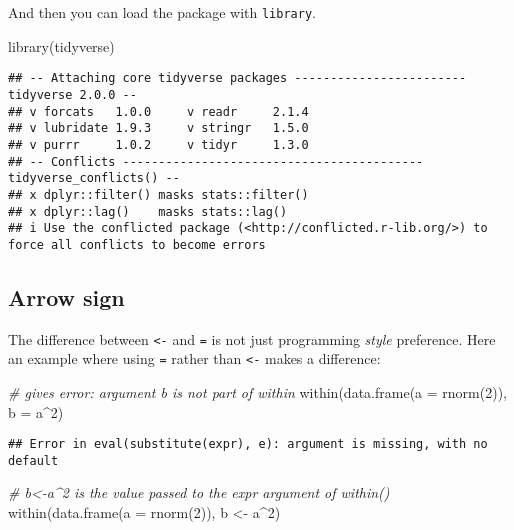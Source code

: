 \documentclass[
  oneside]{book}
\newenvironment{Shaded}{\begin{snugshade}}{\end{snugshade}}
\newcommand{\AttributeTok}[1]{\textcolor[rgb]{0.77,0.63,0.00}{#1}}
\newcommand{\CommentTok}[1]{\textcolor[rgb]{0.56,0.35,0.01}{\textit{#1}}}
\newcommand{\DecValTok}[1]{\textcolor[rgb]{0.00,0.00,0.81}{#1}}
\newcommand{\FunctionTok}[1]{\textcolor[rgb]{0.00,0.00,0.00}{#1}}
\newcommand{\NormalTok}[1]{#1}
\newcommand{\OtherTok}[1]{\textcolor[rgb]{0.56,0.35,0.01}{#1}}
\newcommand{\SpecialCharTok}[1]{\textcolor[rgb]{0.00,0.00,0.00}{#1}}
\begin{document}
And then you can load the package with \texttt{library}.

\begin{Shaded}
\begin{Highlighting}[]
\FunctionTok{library}\NormalTok{(tidyverse)}
\end{Highlighting}
\end{Shaded}

\begin{verbatim}
## -- Attaching core tidyverse packages ------------------------ tidyverse 2.0.0 --
## v forcats   1.0.0     v readr     2.1.4
## v lubridate 1.9.3     v stringr   1.5.0
## v purrr     1.0.2     v tidyr     1.3.0
## -- Conflicts ------------------------------------------ tidyverse_conflicts() --
## x dplyr::filter() masks stats::filter()
## x dplyr::lag()    masks stats::lag()
## i Use the conflicted package (<http://conflicted.r-lib.org/>) to force all conflicts to become errors
\end{verbatim}

\hypertarget{arrow-sign}{%
\subsection{Arrow sign}\label{arrow-sign}}

The difference between \texttt{\textless{}-} and \texttt{=} is not just programming \emph{style} preference.
Here an example where using \texttt{=} rather than \texttt{\textless{}-} makes a difference:

\begin{Shaded}
\begin{Highlighting}[]
\CommentTok{\# gives error: argument \textquotesingle{}b\textquotesingle{} is not part of \textquotesingle{}within\textquotesingle{}}
\FunctionTok{within}\NormalTok{(}\FunctionTok{data.frame}\NormalTok{(}\AttributeTok{a =} \FunctionTok{rnorm}\NormalTok{(}\DecValTok{2}\NormalTok{)), }\AttributeTok{b =}\NormalTok{ a}\SpecialCharTok{\^{}}\DecValTok{2}\NormalTok{)}
\end{Highlighting}
\end{Shaded}

\begin{verbatim}
## Error in eval(substitute(expr), e): argument is missing, with no default
\end{verbatim}

\begin{Shaded}
\begin{Highlighting}[]
\CommentTok{\# \textquotesingle{}b\textless{}{-}a\^{}2\textquotesingle{} is the value passed to the expr argument of within()}
\FunctionTok{within}\NormalTok{(}\FunctionTok{data.frame}\NormalTok{(}\AttributeTok{a =} \FunctionTok{rnorm}\NormalTok{(}\DecValTok{2}\NormalTok{)), b }\OtherTok{\textless{}{-}}\NormalTok{ a}\SpecialCharTok{\^{}}\DecValTok{2}\NormalTok{)}
\end{Highlighting}
\end{Shaded}
\end{document}
